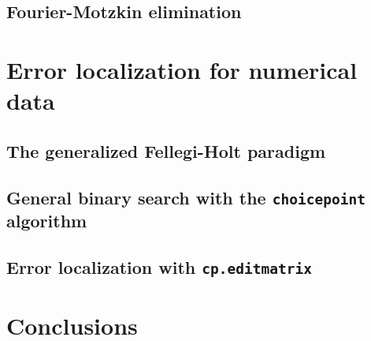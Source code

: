\documentclass[10pt, fleqn, a4paper]{article}
\begin{document}
\subsection{Fourier-Motzkin elimination}
\label{sfouriermotzkin}

\section{Error localization for numerical data}

\subsection{The generalized Fellegi-Holt paradigm}

\subsection{General binary search with the {\tt choicepoint} algorithm}

\subsection{Error localization with {\tt cp.editmatrix}}

\section{Conclusions}

\newpage



\end{document}
